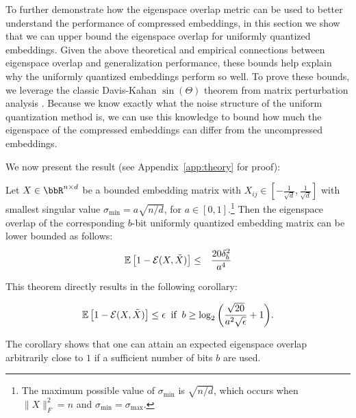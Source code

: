 To further demonstrate how the eigenspace overlap metric can be used to better understand the performance of compressed embeddings, in this section we show that we can upper bound the eigenspace overlap for uniformly quantized embeddings.
Given the above theoretical and empirical connections between eigenspace overlap and generalization performance, these bounds help explain why the uniformly quantized embeddings perform so well.
To prove these bounds, we leverage the classic Davis-Kahan $\sin(\Theta)$ theorem from matrix perturbation analysis \citep{sintheta70}.
Because we know exactly what the noise structure of the uniform quantization method is, we can use this knowledge to bound how much the eigenspace of the compressed embeddings can differ from the uncompressed embeddings.

We now present the result (see Appendix~\ref{app:theory} for proof):
\begin{theorem}
	Let $X \in \RR^{n\times d}$ be a bounded embedding matrix with $X_{ij} \in [-\frac{1}{\sqrt{d}},\frac{1}{\sqrt{d}}]$ with smallest singular value $\sigma_{\min} = a \sqrt{n/d}$, for $a \in [0,1]$.\footnote{The maximum possible value of $\sigma_{\min}$ is $\sqrt{n/d}$, which occurs when $\|X\|_F^2 = n$ and $\sigma_{\min} = \sigma_{\max}$.}
	Then the eigenspace overlap of the corresponding $b$-bit uniformly quantized embedding matrix can be lower bounded as follows:
	\begin{eqnarray*}
		\expect{}{1-\eigover(X,\tX)} &\leq& \frac{20 \delta_b^2}{a^4}
	\end{eqnarray*}
\label{thm1}
\end{theorem}

This theorem directly results in the following corollary:
\begin{corollary}
	$$\expect{}{1-\eigover(X,\tX)} \leq \eps \;\;\text{if}\;\; b \geq \log_2\bigg(\frac{\sqrt{20}}{a^2\sqrt{\eps}}+1\bigg).$$
\end{corollary}
The corollary shows that one can attain an expected eigenspace overlap arbitrarily close to $1$ if a sufficient number of bits $b$ are used.

